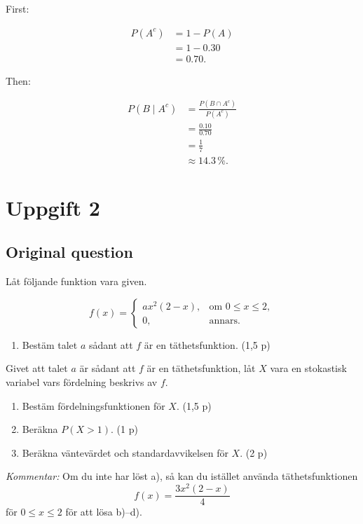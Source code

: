 \documentclass[10pt]{article}
\begin{document}
First:

\begin{align*}
P(A^c)
&=
1-P(A) \\[2mm]
&=
1-0.30 \\[2mm]
&=0.70.
\end{align*}

Then:

\begin{align*}
P(B\mid A^c)
&=
\frac{P(B\cap A^c)}{P(A^c)} \\[2mm]
&=
\frac{0.10}{0.70} \\[2mm]
&=
\frac{1}{7} \\[2mm]
&\approx 14.3\,\%.
\end{align*}

\section*{Uppgift 2}

\subsection*{Original question}
Låt följande funktion vara given.

\[
f(x)=
\begin{cases}
ax^2(2-x),
& \text{om } 0\leq x\leq 2,\\
0,
& \text{annars.}
\end{cases}
\]

\begin{enumerate}[label=\alph*)]
\item Bestäm talet $a$ sådant att $f$ är en täthetsfunktion.
\hfill (1,5 p)
\end{enumerate}

Givet att talet $a$ är sådant att $f$ är en täthetsfunktion,
låt $X$ vara en stokastisk variabel vars fördelning beskrivs av $f$.

\begin{enumerate}[label=\alph*),resume]
\item Bestäm fördelningsfunktionen för $X$.
\hfill (1,5 p)
\item Beräkna $P(X>1)$.
\hfill (1 p)
\item Beräkna väntevärdet och standardavvikelsen för $X$.
\hfill (2 p)
\end{enumerate}

\textit{Kommentar:}
Om du inte har löst a), så kan du istället använda
täthetsfunktionen
\[
f(x)=\frac{3x^2(2-x)}{4}
\]
för $0\leq x\leq 2$ för att lösa b)--d).
\end{document}
